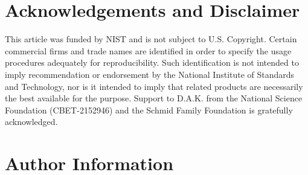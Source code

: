 \documentclass[
  9pt,
  bestpractices,
  pubversion,
]{livecoms}
\begin{document}
\section{\label{sec:ack}Acknowledgements and Disclaimer}

This article was funded by NIST and is not subject to U.S. Copyright.
Certain commercial firms and trade names are identified in order to specify the usage procedures adequately for reproducibility.
Such identification is not intended to imply recommendation or endorsement by the National Institute of Standards and Technology, nor is it intended to imply that related products are necessarily the best available for the purpose.
Support to D.A.K. from the National Science Foundation (CBET-2152946) and the Schmid Family Foundation is gratefully acknowledged.

\section*{Author Information}
\makeorcid

\nocite{*}

\end{document}
